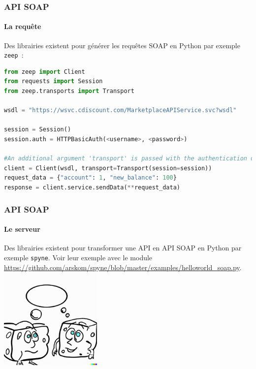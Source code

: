 \documentclass{beamer}
\begin{document}
    \begin{frame}[fragile]
        \transdissolve
        \frametitle{API SOAP}
        \framesubtitle{La requête}
        Des librairies existent pour générer les requêtes SOAP en Python par exemple \lstinline{zeep}~:
        \begin{lstlisting}[language=python,basicstyle=\ttfamily\tiny]
from zeep import Client
from requests import Session
from zeep.transports import Transport

wsdl = "https://wsvc.cdiscount.com/MarketplaceAPIService.svc?wsdl"

session = Session()
session.auth = HTTPBasicAuth(<username>, <password>)

#An additional argument 'transport' is passed with the authentication details
client = Client(wsdl, transport=Transport(session=session))
request_data = {"account": 1, "new_balance": 100}
response = client.service.sendData(**request_data)
        \end{lstlisting}
    \end{frame}

    \begin{frame}
        \transdissolve
        \frametitle{API SOAP}
        \framesubtitle{Le serveur}
        Des librairies existent pour transformer une API en API SOAP en Python par exemple \lstinline{spyne}.
        Voir leur exemple avec le module \url{https://github.com/arskom/spyne/blob/master/examples/helloworld_soap.py}.
        \bigbreak
        \centering
        \includegraphics[width=5cm]{image/soaps-chatting}
    \end{frame}
\end{document}

